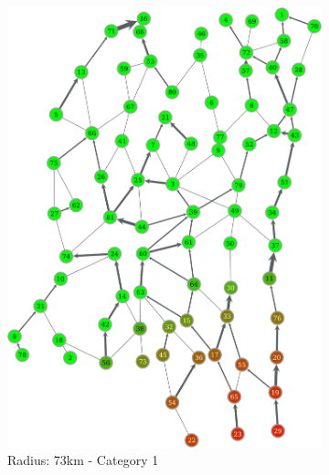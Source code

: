 \documentclass[titlepage]{article}
\begin{document}
    \begin{figure}[H]
      \center
      \begin{subfigure}[b]{0.3\textwidth}
        \center
        \includegraphics[width=\textwidth]{figures/right_73_1-crop.pdf}
        \caption{Radius: 73km - Category 1}
        \label{fig:pop_county60}
      \end{subfigure}~
      \begin{subfigure}[b]{0.3\textwidth}
        \center

\end{subfigure}
\end{figure}
\end{document}
